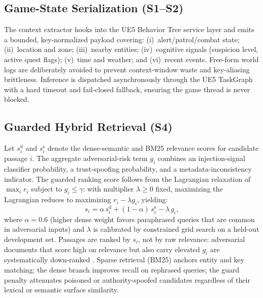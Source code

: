 \documentclass[conference]{IEEEtran}
\begin{document}
\subsection{Game-State Serialization (S1--S2)}

The context extractor hooks into the UE5 Behavior Tree service
layer \cite{EpicGames2025UEBehaviorTrees,Colledanchise2018BehaviorTrees}
and emits a bounded, key-normalized payload covering:
(i)~alert/patrol/combat state; (ii)~location and zone;
(iii)~nearby entities; (iv)~cognitive signals (suspicion level,
active quest flags); (v)~time and weather; and (vi)~recent events.
Free-form world logs are deliberately avoided to prevent
context-window waste and key-aliasing brittleness. Inference is
dispatched asynchronously through the UE5 TaskGraph
\cite{EpicGames2025TaskGraph,EpicGames2025EAsyncExecution} with a
hard timeout and fail-closed fallback, ensuring the game thread is
never blocked.

\subsection{Guarded Hybrid Retrieval (S4)}

Let $s_i^{\mathrm{d}}$ and $s_i^{\mathrm{s}}$ denote the
dense-semantic and BM25 relevance scores for candidate passage
$i$. The aggregate adversarial-risk term $g_i$ combines
an injection-signal classifier probability, a trust-spoofing
probability, and a metadata-inconsistency indicator. The guarded
ranking score follows from the Lagrangian relaxation of
$\max_i r_i$ subject to $g_i\le\gamma$: with multiplier
$\lambda\ge0$ fixed, maximizing the Lagrangian reduces to
maximizing $r_i-\lambda g_i$, yielding:
\begin{equation}
  s_i = \alpha\,s_i^{\mathrm{d}} + (1{-}\alpha)\,s_i^{\mathrm{s}}
        - \lambda\,g_i,
  \label{eq:guard}
\end{equation}
where $\alpha=0.6$ (higher dense weight favors paraphrased
queries that are common in adversarial inputs) and $\lambda$
is calibrated by constrained grid search on a held-out
development set. Passages are ranked by $s_i$, not by raw
relevance: adversarial documents that score high on relevance
but also carry elevated $g_i$ are systematically down-ranked
\cite{Zou2025PoisonedRAG,Chaturvedi2025AIP}. Sparse retrieval
(BM25) anchors entity and key matching; the dense branch
improves recall on rephrased queries; the guard penalty
attenuates poisoned or authority-spoofed candidates regardless
of their lexical or semantic surface similarity.
\end{document}
